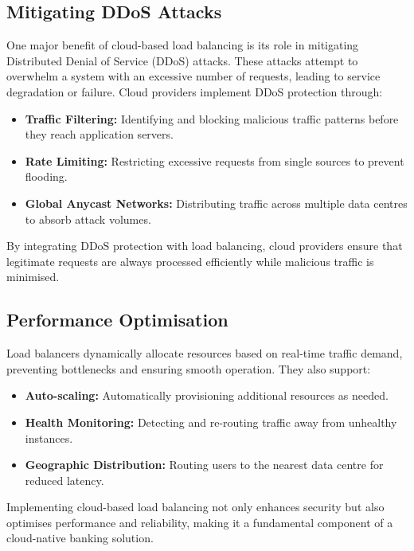 \documentclass{article}
\begin{document}
	\subsection{Mitigating DDoS Attacks}
	\par One major benefit of cloud-based load balancing is its role in mitigating Distributed Denial of Service (DDoS) attacks. These attacks attempt to overwhelm a system with an excessive number of requests, leading to service degradation or failure. Cloud providers implement DDoS protection through:
	\begin{itemize}
		\item \textbf{Traffic Filtering:} Identifying and blocking malicious traffic patterns before they reach application servers.
		\item \textbf{Rate Limiting:} Restricting excessive requests from single sources to prevent flooding.
		\item \textbf{Global Anycast Networks:} Distributing traffic across multiple data centres to absorb attack volumes.
	\end{itemize}
	\par By integrating DDoS protection with load balancing, cloud providers ensure that legitimate requests are always processed efficiently while malicious traffic is minimised.
	\subsection{Performance Optimisation}
	\par Load balancers dynamically allocate resources based on real-time traffic demand, preventing bottlenecks and ensuring smooth operation. They also support:
	\begin{itemize}
		\item \textbf{Auto-scaling:} Automatically provisioning additional resources as needed.
		\item \textbf{Health Monitoring:} Detecting and re-routing traffic away from unhealthy instances.
		\item \textbf{Geographic Distribution:} Routing users to the nearest data centre for reduced latency.
	\end{itemize}
	\par Implementing cloud-based load balancing not only enhances security but also optimises performance and reliability, making it a fundamental component of a cloud-native banking solution.
\end{document}
